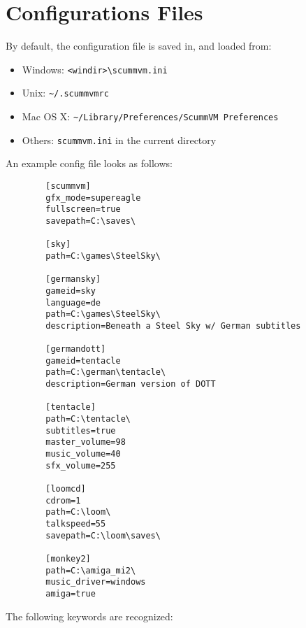 

\section{Configurations Files}


By default, the configuration file is saved in, and loaded from:
%
\begin{itemize}
\item Windows: \verb#<windir>\scummvm.ini#
\item Unix: \verb#~/.scummvmrc#
\item Mac OS X: \verb#~/Library/Preferences/ScummVM Preferences#
\item Others: \verb#scummvm.ini# in the current directory
\end{itemize}
%
An example config file looks as follows:
%
\begin{verbatim}
        [scummvm]
        gfx_mode=supereagle
        fullscreen=true
        savepath=C:\saves\

        [sky]
        path=C:\games\SteelSky\

        [germansky]
        gameid=sky
        language=de
        path=C:\games\SteelSky\
        description=Beneath a Steel Sky w/ German subtitles
        
        [germandott]
        gameid=tentacle
        path=C:\german\tentacle\
        description=German version of DOTT

        [tentacle]
        path=C:\tentacle\
        subtitles=true
        master_volume=98
        music_volume=40
        sfx_volume=255

        [loomcd]
        cdrom=1
        path=C:\loom\
        talkspeed=55
        savepath=C:\loom\saves\
        
        [monkey2]
        path=C:\amiga_mi2\
        music_driver=windows
        amiga=true
\end{verbatim}
%
The following keywords are recognized:

